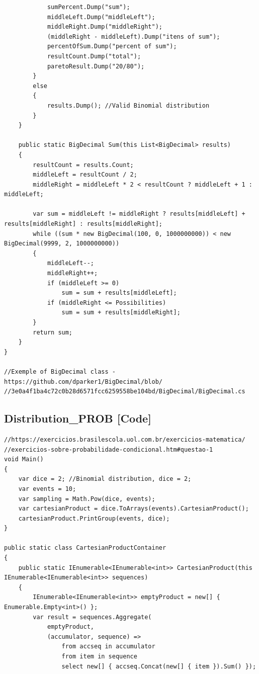 \begin{apendicesenv}
\begin{lstlisting}
            sumPercent.Dump("sum");
            middleLeft.Dump("middleLeft");
            middleRight.Dump("middleRight");
            (middleRight - middleLeft).Dump("itens of sum");
            percentOfSum.Dump("percent of sum");
            resultCount.Dump("total");
            paretoResult.Dump("20/80");
        }
        else
        {
            results.Dump(); //Valid Binomial distribution    
        }
    }
    
    public static BigDecimal Sum(this List<BigDecimal> results)
    {
        resultCount = results.Count;
        middleLeft = resultCount / 2;
        middleRight = middleLeft * 2 < resultCount ? middleLeft + 1 : middleLeft;

        var sum = middleLeft != middleRight ? results[middleLeft] + results[middleRight] : results[middleRight];
        while ((sum * new BigDecimal(100, 0, 1000000000)) < new BigDecimal(9999, 2, 1000000000))
        {
            middleLeft--;
            middleRight++;
            if (middleLeft >= 0)
                sum = sum + results[middleLeft];
            if (middleRight <= Possibilities)
                sum = sum + results[middleRight];
        }
        return sum;
    }
}

//Exemple of BigDecimal class - https://github.com/dparker1/BigDecimal/blob/
//3e0a4f1ba4c72c0b28d6571fcc6259558be104bd/BigDecimal/BigDecimal.cs
\end{lstlisting}

\bigbreak
\bigbreak
\subsection*{Distribution\_PROB [Code]}
\begin{lstlisting}
//https://exercicios.brasilescola.uol.com.br/exercicios-matematica/
//exercicios-sobre-probabilidade-condicional.htm#questao-1
void Main()
{
    var dice = 2; //Binomial distribution, dice = 2;
    var events = 10;
    var sampling = Math.Pow(dice, events);
    var cartesianProduct = dice.ToArrays(events).CartesianProduct();
    cartesianProduct.PrintGroup(events, dice);
}

public static class CartesianProductContainer
{
    public static IEnumerable<IEnumerable<int>> CartesianProduct(this IEnumerable<IEnumerable<int>> sequences)
    {
        IEnumerable<IEnumerable<int>> emptyProduct = new[] { Enumerable.Empty<int>() };
        var result = sequences.Aggregate(
            emptyProduct,
            (accumulator, sequence) =>
                from accseq in accumulator
                from item in sequence
                select new[] { accseq.Concat(new[] { item }).Sum() });


\end{lstlisting}
\end{apendicesenv}
